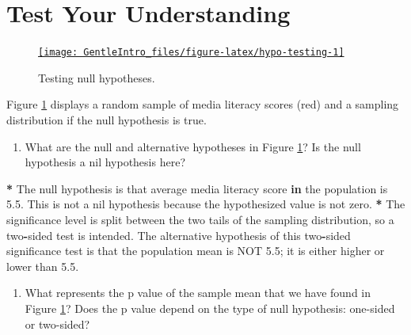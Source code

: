 \documentclass[a4paper]{book}
\newenvironment{Shaded}{\begin{snugshade}}{\end{snugshade}}
\newcommand{\FloatTok}[1]{\textcolor[rgb]{0.00,0.00,0.00}{#1}}
\newcommand{\StringTok}[1]{\textcolor[rgb]{0.00,0.00,0.00}{#1}}
\newcommand{\ControlFlowTok}[1]{\textcolor[rgb]{0.00,0.00,0.00}{\textbf{#1}}}
\newcommand{\OperatorTok}[1]{\textcolor[rgb]{0.00,0.00,0.00}{\textbf{#1}}}
\newcommand{\NormalTok}[1]{#1}
\providecommand{\tightlist}{%
  \setlength{\itemsep}{0pt}\setlength{\parskip}{0pt}}
\theoremstyle{definition}
\theoremstyle{definition}
\theoremstyle{definition}
\theoremstyle{remark}
\begin{document}
\section{Test Your Understanding}\label{test-your-understanding-3}

\begin{figure}[H]
\href{http://82.196.4.233:3838/apps/null-ci/}{\texttt{[image: GentleIntro\_files/figure-latex/hypo-testing-1]} }\caption{Testing null hypotheses.}\label{fig:hypo-testing}
\end{figure}

Figure \ref{fig:hypo-testing} displays a random sample of media literacy
scores (red) and a sampling distribution if the null hypothesis is true.

\begin{enumerate}
\def\labelenumi{\arabic{enumi}.}
\tightlist
\item
  What are the null and alternative hypotheses in Figure
  \ref{fig:hypo-testing}? Is the null hypothesis a nil hypothesis here?
\end{enumerate}

\begin{Shaded}
\begin{Highlighting}[]
\OperatorTok{*}\StringTok{ }\NormalTok{The null hypothesis is that average media literacy}
\NormalTok{score }\ControlFlowTok{in}\NormalTok{ the population is }\FloatTok{5.5}\NormalTok{. This is not a nil}
\NormalTok{hypothesis because the hypothesized value is not zero.}
\OperatorTok{*}\StringTok{ }\NormalTok{The significance level is split between the two tails}
\NormalTok{of the sampling distribution, so a two}\OperatorTok{-}\NormalTok{sided test is}
\NormalTok{intended. The alternative hypothesis of this two}\OperatorTok{-}\NormalTok{sided}
\NormalTok{significance test is that the population mean is NOT}
\FloatTok{5.5}\NormalTok{; it is either higher or lower than }\FloatTok{5.5}\NormalTok{.}
\end{Highlighting}
\end{Shaded}

\begin{enumerate}
\def\labelenumi{\arabic{enumi}.}
\setcounter{enumi}{1}
\tightlist
\item
  What represents the p value of the sample mean that we have found in
  Figure \ref{fig:hypo-testing}? Does the p value depend on the type of
  null hypothesis: one-sided or two-sided?
\end{enumerate}
\end{document}
